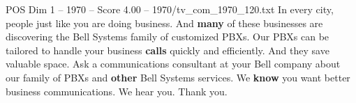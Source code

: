 \begin{textsample}{POS Dim 1 – 1970 – Score 4.00 – 1970/tv\_com\_1970\_120.txt}  \label{ex:f1_pos_037}
In every city, people just like you are doing business.
And \textbf{many} of these businesses are discovering the Bell Systems family of customized PBXs.
Our PBXs can be tailored to handle your business \textbf{calls} quickly and efficiently.
And they save valuable space.
Ask a communications consultant at your Bell company about our family of PBXs and \textbf{other} Bell Systems services.
We \textbf{know} you want better business communications.
We hear you.
Thank you.

\end{textsample}
